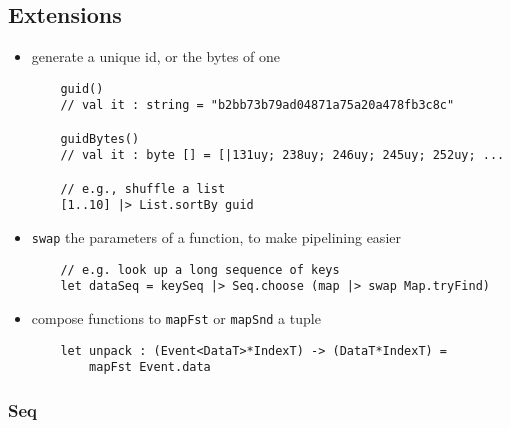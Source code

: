 \documentclass{article}
\begin{document}
\subsection{Extensions}

\begin{itemize}
\item generate a unique id, or the bytes of one
\begin{verbatim}
    guid()
    // val it : string = "b2bb73b79ad04871a75a20a478fb3c8c"

    guidBytes()
    // val it : byte [] = [|131uy; 238uy; 246uy; 245uy; 252uy; ...

    // e.g., shuffle a list
    [1..10] |> List.sortBy guid
\end{verbatim}


\item \texttt{swap} the parameters of a function, to make pipelining easier
\begin{verbatim}
    // e.g. look up a long sequence of keys
    let dataSeq = keySeq |> Seq.choose (map |> swap Map.tryFind)
\end{verbatim}

\item compose functions to \texttt{mapFst} or \texttt{mapSnd} a tuple
\begin{verbatim}
    let unpack : (Event<DataT>*IndexT) -> (DataT*IndexT) =
        mapFst Event.data
\end{verbatim}

\end{itemize}

\subsubsection{Seq}
\end{document}
